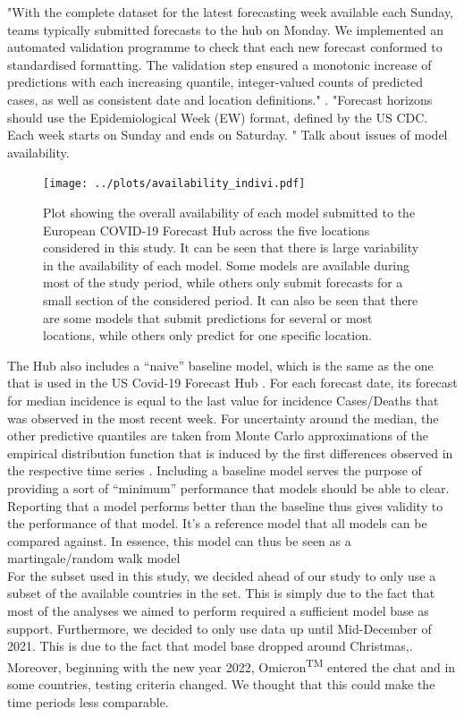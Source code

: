 "With the complete dataset for the latest forecasting week available each Sunday, teams typically
submitted forecasts to the hub on Monday. We implemented an automated validation
programme to check that each new forecast conformed to standardised formatting. The
validation step ensured a monotonic increase of predictions with each increasing quantile,
integer-valued counts of predicted cases, as well as consistent date and location definitions." \citep{sherratt_draft_nodate}.
"Forecast horizons should use the Epidemiological Week (EW) format, defined by the US CDC. Each week starts on Sunday and ends on Saturday. "
Talk about issues of model availability.\\
\begin{figure}
\texttt{[image: ../plots/availability\_indivi.pdf]}
\caption{Plot showing the overall availability of each model submitted to the European COVID-19 Forecast Hub across the five locations considered in this study. It can be seen that there is large variability in the availability of each model. Some models are available during most of the study period, while others only submit forecasts for a small section of the considered period. It can also be seen that there are some models that submit predictions for several or most locations, while others only predict for one specific location.}
\end{figure}
The Hub also includes a ``naive'' baseline model, which is the same as the one that is used in the US Covid-19 Forecast Hub . For each forecast date, its forecast for median incidence is equal to the last value for incidence Cases/Deaths that was observed in the most recent week. For uncertainty around the median, the other predictive quantiles are taken from Monte Carlo approximations of the empirical distribution function that is induced by the first differences observed in the respective time series \citep{cramer_evaluation_2022}. Including a baseline model serves the purpose of providing a sort of ``minimum'' performance that models should be able to clear. Reporting that a model performs better than the baseline thus gives validity to the performance of that model. It's a reference model that all models can be compared against. In essence, this model can thus be seen as a martingale/random walk model\\
For the subset used in this study, we decided ahead of our study to only use a subset of the available countries in the set. This is simply due to the fact that most of the analyses we aimed to perform required a sufficient model base as support. Furthermore, we decided to only use data up until Mid-December of 2021. This is due to the fact that model base dropped around Christmas,. Moreover, beginning with the new year 2022, Omicron\textsuperscript{TM} entered the chat and in some countries, testing criteria changed. We thought that this could make the time periods less comparable.\\
